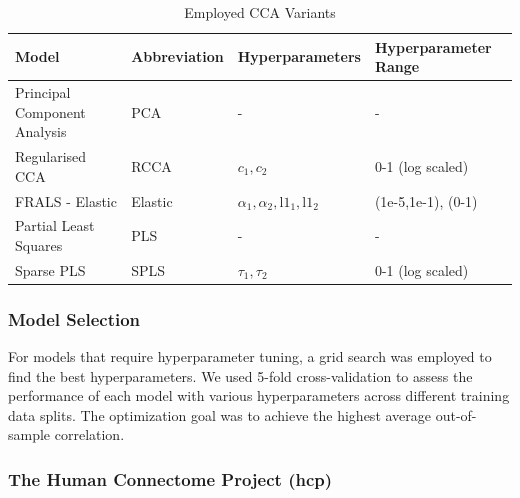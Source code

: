 \begin{table}[h]
    \centering
    \caption{Employed CCA Variants}
    \begin{tabular}{|l|l|l|l|}
        \hline
        \textbf{Model}               & \textbf{Abbreviation} & \textbf{Hyperparameters}                         & \textbf{Hyperparameter Range} \\
        \hline
        Principal Component Analysis & PCA                   & -                                                & -                             \\
        \hline
        Regularised CCA              & RCCA                  & \(c_1, c_2\)                                     & 0-1 (log scaled)              \\
        \hline
        FRALS - Elastic              & Elastic               & \(\alpha_1, \alpha_2, \text{l1}_1, \text{l1}_2\) & (1e-5,1e-1), (0-1)            \\
        \hline
        Partial Least Squares        & PLS                   & -                                                & -                             \\
        \hline
        Sparse PLS                   & SPLS                  & \(\tau_1, \tau_2\)                               & 0-1 (log scaled)              \\
        \hline
    \end{tabular}\label{tab:cca-variants}
\end{table}

\subsubsection{Model Selection}

For models that require hyperparameter tuning, a grid search was employed to find the best hyperparameters. 
We used 5-fold cross-validation to assess the performance of each model with various hyperparameters across different training data splits. 
The optimization goal was to achieve the highest average out-of-sample correlation.

\subsubsection{The Human Connectome Project (\acrshort{hcp})}

